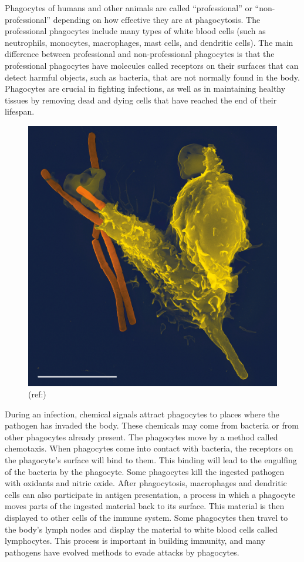 Phagocytes of humans and other animals are called ``professional'' or ``non-professional'' depending on how effective they are at phagocytosis. The professional phagocytes include many types of white blood cells (such as neutrophils, monocytes, macrophages, mast cells, and dendritic cells). The main difference between professional and non-professional phagocytes is that the professional phagocytes have molecules called receptors on their surfaces that can detect harmful objects, such as bacteria, that are not normally found in the body. Phagocytes are crucial in fighting infections, as well as in maintaining healthy tissues by removing dead and dying cells that have reached the end of their lifespan.



\begin{figure}

{\centering \includegraphics[width=0.7\linewidth]{./figures/immune/Neutrophil_with_anthrax_copy} 

}

\caption{(ref:)}\label{fig:unnamed-chunk-1}
\end{figure}

During an infection, chemical signals attract phagocytes to places where the pathogen has invaded the body. These chemicals may come from bacteria or from other phagocytes already present. The phagocytes move by a method called chemotaxis. When phagocytes come into contact with bacteria, the receptors on the phagocyte's surface will bind to them. This binding will lead to the engulfing of the bacteria by the phagocyte. Some phagocytes kill the ingested pathogen with oxidants and nitric oxide. After phagocytosis, macrophages and dendritic cells can also participate in antigen presentation, a process in which a phagocyte moves parts of the ingested material back to its surface. This material is then displayed to other cells of the immune system. Some phagocytes then travel to the body's lymph nodes and display the material to white blood cells called lymphocytes. This process is important in building immunity, and many pathogens have evolved methods to evade attacks by phagocytes.



